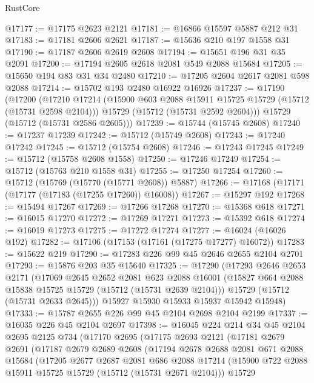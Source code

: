 \begin{lexlean}{RustCore}
\begin{coremodule}
@17177 := @17175 @2623 @2121
@17181 := @16866 @15597 @5887 @212 @31
@17183 := @17181 @2606 @2621
@17187 := @15636 @210 @197 @1558 @31
@17190 := @17187 @2606 @2619 @2608
@17194 := @15651 @196 @31 @35 @2091
@17200 := @17194 @2605 @2618 @2081 @549 @2088 @15684
@17205 := @15650 @194 @83 @31 @34 @2480
@17210 := @17205 @2604 @2617 @2081 @598 @2088
@17214 := @15702 @193 @2480 @16922 @16926
@17237 := @17190
    (@17200
      (@17210
        @17214
        (@15900 @603 @2088 @15911 @15725 @15729 (@15712 (@15731 @2598 @2104)))
        @15729
        (@15712 (@15731 @2592 @2604)))
      @15729
      (@15712 (@15731 @2586 @2605)))
@17239 := @15744 (@15745 @2608)
@17240 := @17237 @17239
@17242 := @15712 (@15749 @2608)
@17243 := @17240 @17242
@17245 := @15712 (@15754 @2608)
@17246 := @17243 @17245
@17249 := @15712 (@15758 @2608 @1558)
@17250 := @17246 @17249
@17254 := @15712 (@15763 @210 @1558 @31)
@17255 := @17250 @17254
@17260 := @15712 (@15769 (@15770 (@15771 @2608)) @5887)
@17266 := @17168 (@17171 (@17177 (@17183 (@17255 @17260)) @16008))
@17267 := @15297 @192
@17268 := @15494 @17267
@17269 := @17266 @17268
@17270 := @15368 @618
@17271 := @16015 @17270
@17272 := @17269 @17271
@17273 := @15392 @618
@17274 := @16019 @17273
@17275 := @17272 @17274
@17277 := @16024 (@16026 @192)
@17282 := @17106 (@17153 (@17161 (@17275 @17277) @16072))
@17283 := @15622 @219
@17290 := @17283 @226 @99 @45 @2646 @2655 @2104 @2701
@17293 := @15876 @203 @35 @15640
@17325 := @17290
    (@17293
      @2646
      @2653
      @2171
      (@17069
        @2645
        @2652
        @2081
        @623
        @2088
        @16001
        (@15827 @664 @2088 @15838 @15725 @15729 (@15712 (@15731 @2639 @2104)))
        @15729
        (@15712 (@15731 @2633 @2645)))
      @15927
      @15930
      @15933
      @15937
      @15942
      @15948)
@17333 := @15787 @2655 @226 @99 @45 @2104 @2698 @2104 @2199
@17337 := @16035 @226 @45 @2104 @2697
@17398 := @16045
    @224
    @214
    @34
    @45
    @2104
    @2695
    @2125
    @734
    (@17170
      @2695
      (@17175
        @2693
        @2121
        (@17181
          @2679
          @2691
          (@17187
            @2679
            @2689
            @2608
            (@17194
              @2678
              @2688
              @2081
              @671
              @2088
              @15684
              (@17205
                @2677
                @2687
                @2081
                @686
                @2088
                @17214
                (@15900 @722 @2088 @15911 @15725 @15729 (@15712 (@15731 @2671 @2104)))
                @15729

\end{coremodule}
\end{lexlean}
